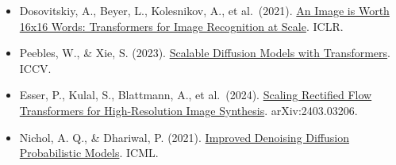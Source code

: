 \vspace{0.25em}
\begin{itemize}
\tightlist
\item
  Dosovitskiy, A., Beyer, L., Kolesnikov, A., et al.~(2021). \href{https://arxiv.org/abs/2010.11929}{An Image is Worth 16x16 Words: Transformers for Image Recognition at Scale}. ICLR.
\item
  Peebles, W., \& Xie, S. (2023). \href{https://arxiv.org/abs/2212.09748}{Scalable Diffusion Models with Transformers}. ICCV.
\item
  Esser, P., Kulal, S., Blattmann, A., et al.~(2024). \href{https://arxiv.org/abs/2403.03206}{Scaling Rectified Flow Transformers for High-Resolution Image Synthesis}. arXiv:2403.03206.
\item
  Nichol, A. Q., \& Dhariwal, P. (2021). \href{https://arxiv.org/abs/2102.09672}{Improved Denoising Diffusion Probabilistic Models}. ICML.
\end{itemize}

\clearpage
